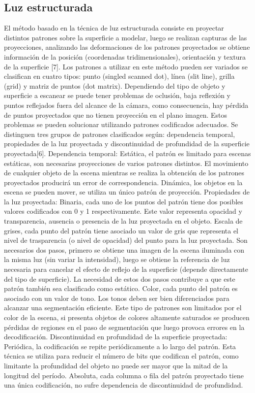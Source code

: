 \subsection{Luz estructurada}

El método basado en la técnica de luz estructurada consiste en proyectar distintos patrones sobre la superficie a modelar, luego se realizan capturas de las proyecciones, analizando las deformaciones de los patrones proyectados se obtiene información de la posición (coordenadas tridimensionales), orientación y textura de la superficie [7].
Los patrones a utilizar en este método pueden ser variados se clasifican en cuatro tipos: punto (singled scanned dot), línea (slit line), grilla (grid) y matriz de puntos (dot matrix).
Dependiendo del tipo de objeto y superficie a escanear se puede tener problemas de oclusión, baja reflexión y puntos reflejados fuera del alcance de la cámara, como consecuencia, hay pérdida de puntos proyectados que no tienen proyección en el plano imagen.
Estos problemas se pueden solucionar utilizando patrones codificados adecuados. Se distinguen tres grupos de patrones clasificados según: dependencia temporal, propiedades de la luz proyectada y discontinuidad de profundidad de la superficie proyectada[6].
   Dependencia  temporal:
   Estática, el patrón es limitado para escenas estáticas, son necesarias proyecciones de varios patrones distintos. El movimiento de cualquier objeto de la escena mientras se realiza la obtención de los patrones proyectados producirá un error de correspondencia.
   Dinámica, los objetos en la escena se pueden mover, se utiliza un único patrón de proyección.
   Propiedades de la luz proyectada:
   Binaria, cada uno de los puntos del patrón tiene dos posibles valores codificados con 0 y 1 respectivamente. Este valor representa opacidad y transparencia, ausencia o presencia de la luz proyectada en el objeto.
   Escala de grises, cada punto del patrón tiene asociado un valor de gris que representa el nivel de trasparencia (o nivel de opacidad) del punto para la luz proyectada. Son necesarios dos pasos, primero se obtiene una imagen de la escena iluminada con la misma luz (sin variar la intensidad), luego se obtiene la referencia de luz necesaria para cancelar el efecto de reflejo de la superficie (depende directamente del tipo de superficie). La necesidad de estos dos pasos contribuye a que este patrón también sea clasificado como estático.
   Color, cada punto del patrón es asociado con un valor de tono. Los tonos deben ser bien diferenciados para alcanzar una segmentación eficiente. Este tipo de patrones son limitados por el color de la escena, si presenta objetos de colores altamente saturados se producen pérdidas de regiones en el paso de segmentación que luego provoca errores en la decodificación.
   Discontinuidad en profundidad de la superficie proyectada:
   Periódica, la codificación se repite periódicamente a lo largo del patrón. Esta  técnica se utiliza para reducir el número de bits que codifican el patrón,
como limitante la profundidad del objeto no puede ser mayor que la mitad de la longitud del período.
   Absoluta, cada columna o fila del patrón proyectado tiene una única codificación, no sufre dependencia de discontinuidad de profundidad.
   
